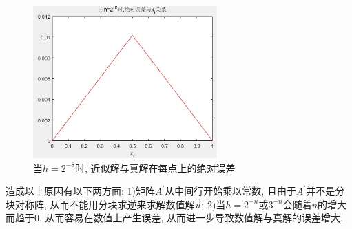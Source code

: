 \documentclass[12pt]{article}
\begin{document}
\begin{figure}[H]
	\centering
	\includegraphics[width=0.63\textwidth]{12}
	\caption{当$h=2^{-8}$时, 近似解与真解在每点上的绝对误差}
\end{figure}
\noindent 造成以上原因有以下两方面: 1)矩阵$A^{'}$从中间行开始乘以常数, 且由于$A^{'}$并不是分块对称阵, 从而不能用分块求逆来求解数值解$\overset{\rightarrow}{u}$; 2)当$h=2^{-n}$或$3^{-n}$会随着$n$的增大而趋于0, 从而容易在数值上产生误差, 从而进一步导致数值解与真解的误差增大.\\
\quad \\
\end{document}
